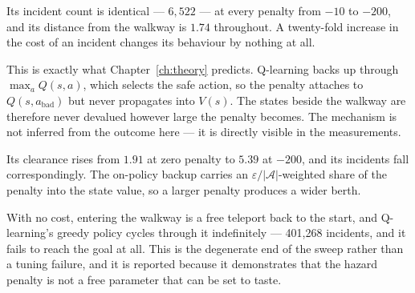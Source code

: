  Its incident count
is identical --- $6{,}522$ --- at every penalty from $-10$ to $-200$, and its distance from the
walkway is $1.74$ throughout. A twenty-fold increase in the cost of an incident changes its
behaviour by nothing at all.

This is exactly what Chapter~\ref{ch:theory} predicts. Q-learning backs up through
$\max_a Q(s,a)$, which selects the safe action, so the penalty attaches to
$Q(s, a_{\text{bad}})$ but never propagates into $V(s)$. The states beside the walkway are
therefore never devalued however large the penalty becomes. The mechanism is not inferred from the
outcome here --- it is directly visible in the measurements.

 Its clearance rises from $1.91$ at zero penalty to $5.39$
at $-200$, and its incidents fall correspondingly. The on-policy backup carries an
$\varepsilon/|\mathcal{A}|$-weighted share of the penalty into the state value, so a larger
penalty produces a wider berth.

 With no cost,
entering the walkway is a free teleport back to the start, and Q-learning's greedy policy cycles
through it indefinitely --- 401{,}268 incidents, and it fails to reach the goal at all. This is the
degenerate end of the sweep rather than a tuning failure, and it is reported because it
demonstrates that the hazard penalty is not a free parameter that can be set to taste.
